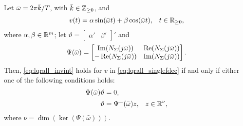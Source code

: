 \begin{lemma}
	\label{lem:lqrall_solconstr}
	Let $\bar{\omega} = 2\pi\bar{k}/T$, with $\bar{k}\in\mathbb{Z}_{\geq 0}$, and
	\begin{align}
		\label{eq:lqrall_singlefdec}
		v(t) &= \alpha \sin(\bar{\omega}t) + \beta\cos(\bar{\omega}t), & t\in\mathbb{R}_{\geq 0},
	\end{align}
	where $\alpha,\beta\in\mathbb{R}^m$; let $\vartheta = \begin{bmatrix}\alpha' & \beta'\end{bmatrix}'$ and
	\begin{equation}
		\label{eq:lqrall_psi}
		\Psi(\bar{\omega}) = \begin{bmatrix}
      \operatorname{Im}(N_\Sigma(j\bar{\omega})) & \operatorname{Re}(N_\Sigma(j\bar{\omega})) \\
      -\operatorname{Re}(N_\Sigma(j\bar{\omega})) & \operatorname{Im}(N_\Sigma(j\bar{\omega}))
    \end{bmatrix}.
	\end{equation}
	Then, \eqref{eq:lqrall_invint} holds for $v$ in \eqref{eq:lqrall_singlefdec} if and only if either one of the following conditions holds:
	\begin{subequations}
		\begin{align}
			\label{eq:lqrall_psisys}
			\Psi(\bar{\omega})\vartheta &= 0, &\\
			\label{eq:lqrall_psisys_bis}
			\vartheta &= \Psi^\perp(\bar{\omega})z, & z\in\mathbb{R}^\nu,
		\end{align}
	\end{subequations}
	where $\nu = \dim(\ker(\Psi(\bar{\omega})))$.\closestatement
\end{lemma}
